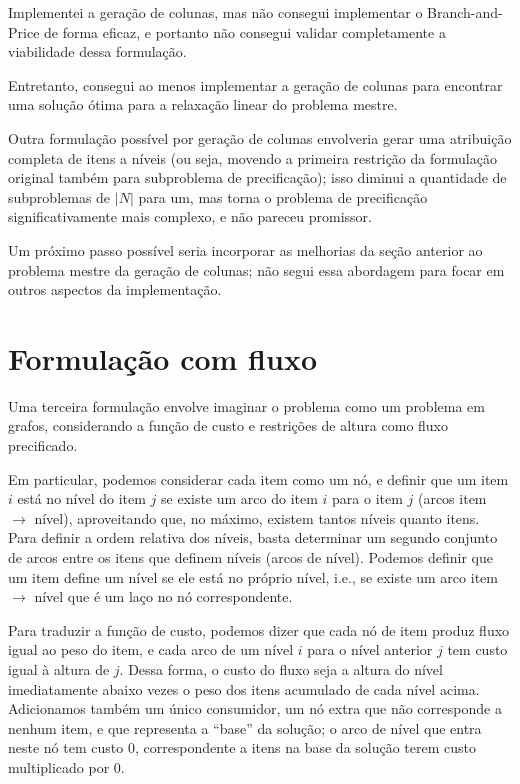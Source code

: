 \documentclass{article}
\begin{document}
Implementei a geração de colunas, mas não consegui implementar o Branch-and-Price de forma eficaz, e portanto não consegui validar completamente a viabilidade dessa formulação.

Entretanto, consegui ao menos implementar a geração de colunas para encontrar uma solução ótima para a relaxação linear do problema mestre.

Outra formulação possível por geração de colunas envolveria gerar uma atribuição completa de itens a níveis (ou seja, movendo a primeira restrição da formulação original também para subproblema de precificação); isso diminui a quantidade de subproblemas de $|N|$ para um, mas torna o problema de precificação significativamente mais complexo, e não pareceu promissor.

Um próximo passo possível seria incorporar as melhorias da seção anterior ao problema mestre da geração de colunas; não segui essa abordagem para focar em outros aspectos da implementação.

\section{Formulação com fluxo}

Uma terceira formulação envolve imaginar o problema como um problema em grafos, considerando a função de custo e restrições de altura como fluxo precificado.

Em particular, podemos considerar cada item como um nó, e definir que um item $i$ está no nível do item $j$ se existe um arco do item $i$ para o item $j$ (arcos item $\rightarrow$ nível), aproveitando que, no máximo, existem tantos níveis quanto itens. Para definir a ordem relativa dos níveis, basta determinar um segundo conjunto de arcos entre os itens que definem níveis (arcos de nível). Podemos definir que um item define um nível se ele está no próprio nível, i.e., se existe um arco item $\rightarrow$ nível que é um laço no nó correspondente.

Para traduzir a função de custo, podemos dizer que cada nó de item produz fluxo igual ao peso do item, e cada arco de um nível $i$ para o nível anterior $j$ tem custo igual à altura de $j$. Dessa forma, o custo do fluxo seja a altura do nível imediatamente abaixo vezes o peso dos itens acumulado de cada nível acima. Adicionamos também um único consumidor, um nó extra que não corresponde a nenhum item, e que representa a ``base'' da solução; o arco de nível que entra neste nó tem custo 0, correspondente a itens na base da solução terem custo multiplicado por 0.
\end{document}
